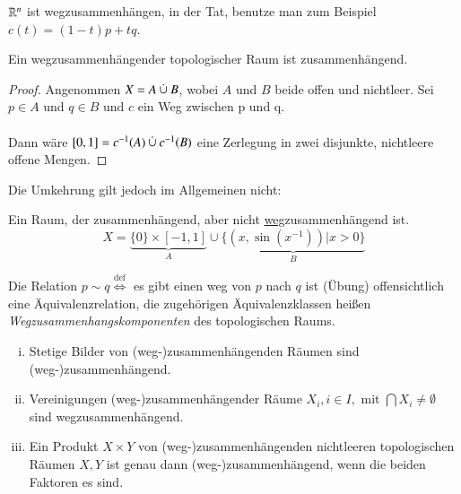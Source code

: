 \documentclass[a4paper,10pt]{scrartcl}
\begin{document}
\begin{ex*}
$ \mathbb{R}^n $ ist wegzusammenhängen, in der Tat, benutze man zum Beispiel $ c(t)=(1-t)p+tq $. \fixme[fig20]
\end{ex*}
\begin{st}
Ein wegzusammenhängender topologischer Raum ist zusammenhängend.
\end{st}
\begin{proof}
Angenommen $ X=A\mathbin{\dot{\cup}} B $, wobei $ A $ und $ B $ beide offen und nichtleer.  Sei $ p\in A $ und $ q\in B $ und $ c $ ein Weg zwischen p und q. \\ \fixme[fig21]\\
Dann wäre $[0,1]=c^{-1}(A)\mathbin{\dot{\cup}} c^{-1}(B)$ eine Zerlegung in zwei disjunkte, nichtleere offene Mengen.
\end{proof}
Die Umkehrung gilt jedoch im Allgemeinen nicht:
\begin{ex*}
Ein Raum, der zusammenhängend, aber nicht \underline{weg}zusammenhängend ist.
\[
X=\underbrace{\{0\}\times [-1,1]}_{A}\cup\underbrace{\{(x, \sin(x^{-1}))|x>0\}}_{B}
\] 
\fixme[fig22]
\end{ex*}
Die Relation $ p\sim q \stackrel{\text{def}}{\iff} $ es gibt einen weg von $ p $ nach $ q $ ist (Übung) offensichtlich eine Äquivalenzrelation, die zugehörigen Äquivalenzklassen heißen \emph{Wegzusammenhangskomponenten} des topologischen Raums.
\begin{st}
\begin{enumerate}[(i)]
\item Stetige Bilder von (weg-)zusammenhängenden Räumen sind (weg-)zusammenhängend.
\item Vereinigungen (weg-)zusammenhängender Räume $ X_i, i\in I, $ mit $ \bigcap X_i\neq \emptyset $ sind wegzusammenhängend.
\item Ein Produkt $ X\times Y $ von (weg-)zusammenhängenden nichtleeren topologischen Räumen $ X,Y $ ist genau dann (weg-)zusammenhängend, wenn die beiden Faktoren es sind. 
\end{enumerate}
\end{st}
\end{document}
